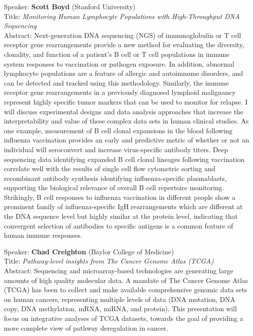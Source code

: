 \documentclass[11pt]{article}
\begin{document}
\bigskip
\noindent
Speaker: {\bf Scott Boyd} (Stanford University)\\
Title: {\it Monitoring Human Lymphocyte Populations with High-Throughput DNA Sequencing}\\
Abstract: Next-generation DNA sequencing (NGS) of immunoglobulin or T
cell receptor gene rearrangements provide a new method for evaluating
the diversity, clonality, and function of a patient’s B cell or T cell
populations in immune system responses to vaccination or pathogen
exposure. In addition, abnormal lymphocyte populations are a feature
of allergic and autoimmune disorders, and can be detected and tracked
using this methodology. Similarly, the immune receptor gene
rearrangements in a previously diagnosed lymphoid malignancy represent
highly specific tumor markers that can be used to monitor for
relapse. I will discuss experimental designs and data analysis
approaches that increase the interpretability and value of these
complex data sets in human clinical studies. As one example,
measurement of B cell clonal expansions in the blood following
influenza vaccination provides an early and predictive metric of
whether or not an individual will seroconvert and increase
virus-specific antibody titers. Deep sequencing data identifying
expanded B cell clonal lineages following vaccination correlate well
with the results of single cell flow cytometric sorting and
recombinant antibody synthesis identifying influenza-specific
plasmablasts, supporting the biological relevance of overall B cell
repertoire monitoring. Strikingly, B cell responses to influenza
vaccination in different people show a prominent family of
influenza-specific IgH rearrangements which are different at the DNA
sequence level but highly similar at the protein level, indicating
that convergent selection of antibodies to specific antigens is a
common feature of human immune responses.

\bigskip
\noindent
Speaker: {\bf Chad Creighton} (Baylor College of Medicine)\\
Title: {\it Pathway-level insights from The Cancer Genome Atlas (TCGA)}\\
Abstract: Sequencing and microarray-based technologies are generating
large amounts of high quality molecular data. A mandate of The Cancer
Genome Atlas (TCGA) has been to collect and make available
comprehensive genomic data sets on human cancers, representing
multiple levels of data (DNA mutation, DNA copy, DNA methylation,
mRNA, miRNA, and protein). This presentation will focus on integrative
analyses of TCGA datasets, towards the goal of providing a more
complete view of pathway deregulation in cancer.
\end{document}
